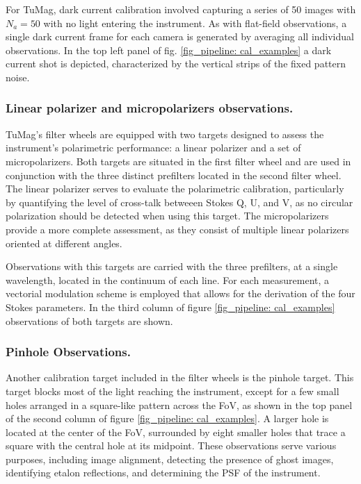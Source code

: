 For TuMag, dark current calibration involved capturing a series of 50 images with $N_a = 50$ with no light entering the instrument. As with flat-field observations, a single dark current frame for each camera is generated by averaging all individual observations. In the top left panel of fig. \ref{fig_pipeline: cal_examples} a dark current shot is depicted, characterized by the vertical strips of the fixed pattern noise.  

\subsubsection{Linear polarizer and micropolarizers observations.}

TuMag's filter wheels are equipped with two targets designed to assess the instrument's polarimetric performance: a linear polarizer and a set of micropolarizers. Both targets are situated in the first filter wheel and are used in conjunction with the three distinct prefilters located in the second filter wheel. The linear polarizer serves to evaluate the polarimetric calibration, particularly by quantifying the level of cross-talk betweeen Stokes Q, U, and V, as no circular polarization should be detected when using this target. The micropolarizers provide a more complete assessment, as they consist of multiple linear polarizers oriented at different angles. 

Observations with this targets are carried with the three prefilters, at a single wavelength, located in the continuum of each line. For each measurement, a vectorial modulation scheme is employed that allows for the derivation of the four Stokes parameters. In the third column of figure \ref{fig_pipeline: cal_examples} observations of both targets are shown. 

\subsubsection{Pinhole Observations.}

Another calibration target included in the filter wheels is the pinhole target. This target blocks most of the light reaching the instrument, except for a few small holes arranged in a square-like pattern across the FoV, as shown in the top panel of the second column of figure \ref{fig_pipeline: cal_examples}. A larger hole is located at the center of the FoV, surrounded by eight smaller holes that trace a square with the central hole at its midpoint. These observations serve various purposes, including image alignment, detecting the presence of ghost images, identifying etalon reflections, and determining the PSF of the instrument.

